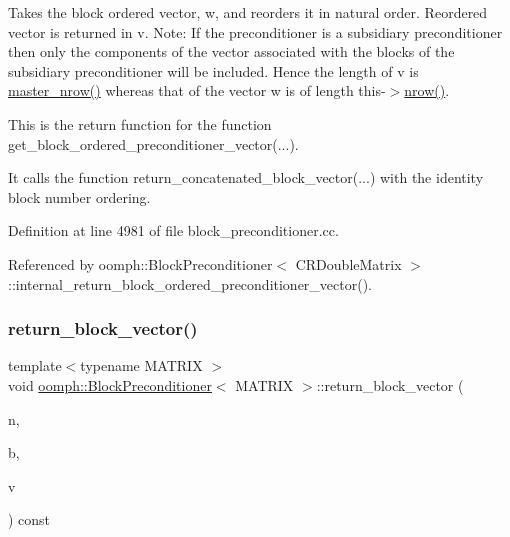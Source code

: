 Takes the block ordered vector, w, and reorders it in natural order. Reordered vector is returned in v. Note\+: If the preconditioner is a subsidiary preconditioner then only the components of the vector associated with the blocks of the subsidiary preconditioner will be included. Hence the length of v is \hyperlink{classoomph_1_1BlockPreconditioner_a3e5b553f65e6c25354a5c908d507e8ee}{master\+\_\+nrow()} whereas that of the vector w is of length this-\/$>$\hyperlink{classoomph_1_1DistributableLinearAlgebraObject_a7569556f14fd68b28508920e89bd5eee}{nrow()}. 

This is the return function for the function get\+\_\+block\+\_\+ordered\+\_\+preconditioner\+\_\+vector(...).

It calls the function return\+\_\+concatenated\+\_\+block\+\_\+vector(...) with the identity block number ordering. 

Definition at line 4981 of file block\+\_\+preconditioner.\+cc.



Referenced by oomph\+::\+Block\+Preconditioner$<$ C\+R\+Double\+Matrix $>$\+::internal\+\_\+return\+\_\+block\+\_\+ordered\+\_\+preconditioner\+\_\+vector().

\mbox{\label{classoomph_1_1BlockPreconditioner_a1dd4d3cd6b64fa64e1ff6730b0deecc7}} 
\subsubsection{\texorpdfstring{return\+\_\+block\+\_\+vector()}{return\_block\_vector()}}
{\footnotesize\ttfamily template$<$typename M\+A\+T\+R\+IX $>$ \\
void \hyperlink{classoomph_1_1BlockPreconditioner}{oomph\+::\+Block\+Preconditioner}$<$ M\+A\+T\+R\+IX $>$\+::return\+\_\+block\+\_\+vector (\begin{DoxyParamCaption}\item[{const unsigned \&}]{n,  }\item[{const \hyperlink{classoomph_1_1DoubleVector}{Double\+Vector} \&}]{b,  }\item[{\hyperlink{classoomph_1_1DoubleVector}{Double\+Vector} \&}]{v }\end{DoxyParamCaption}) const}



